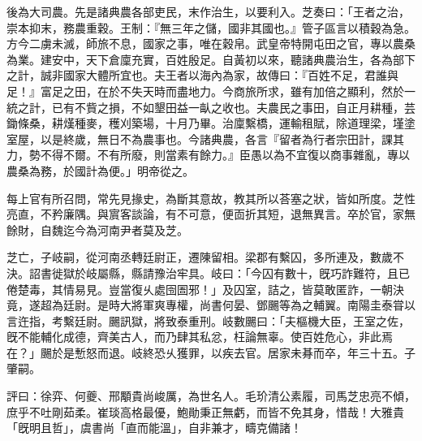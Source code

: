 \begin{pinyinscope}
 
 
 
 後為大司農。先是諸典農各部吏民，末作治生，以要利入。芝奏曰：「王者之治，崇本抑末，務農重穀。王制：『無三年之儲，國非其國也。』管子區言以積穀為急。方今二虜未滅，師旅不息，國家之事，唯在穀帛。武皇帝特開屯田之官，專以農桑為業。建安中，天下倉廩充實，百姓殷足。自黃初以來，聽諸典農治生，各為部下之計，誠非國家大體所宜也。夫王者以海內為家，故傳曰：『百姓不足，君誰與足！』富足之田，在於不失天時而盡地力。今商旅所求，雖有加倍之顯利，然於一統之計，已有不貲之損，不如墾田益一畒之收也。夫農民之事田，自正月耕種，芸鋤條桑，耕熯種麥，穫刈築場，十月乃畢。治廩繫橋，運輸租賦，除道理梁，墐塗室屋，以是終歲，無日不為農事也。今諸典農，各言『留者為行者宗田計，課其力，勢不得不爾。不有所廢，則當素有餘力。』臣愚以為不宜復以商事雜亂，專以農桑為務，於國計為便。」明帝從之。
 
 
 
 
 每上官有所召問，常先見掾史，為斷其意故，教其所以荅塞之狀，皆如所度。芝性亮直，不矜廉隅。與賔客談論，有不可意，便靣折其短，退無異言。卒於官，家無餘財，自魏迄今為河南尹者莫及芝。
 
 
芝亡，子岐嗣，從河南丞轉廷尉正，遷陳留相。梁郡有繫囚，多所連及，數歲不決。詔書徙獄於岐屬縣，縣請豫治牢具。岐曰：「今囚有數十，旣巧詐難符，且已倦楚毒，其情易見。豈當復乆處囹圄邪！」及囚室，詰之，皆莫敢匿詐，一朝決竟，遂超為廷尉。是時大將軍爽專權，尚書何晏、鄧颺等為之輔翼。南陽圭泰甞以言迕指，考繫廷尉。颺訊獄，將致泰重刑。岐數颺曰：「夫樞機大臣，王室之佐，旣不能輔化成德，齊美古人，而乃肆其私忿，枉論無辜。使百姓危心，非此焉在？」颺於是慙怒而退。岐終恐乆獲罪，以疾去官。居家未朞而卒，年三十五。子肇嗣。
 
 
 
 
 評曰：徐弈、何夔、邢顒貴尚峻厲，為世名人。毛玠清公素履，司馬芝忠亮不傾，庶乎不吐剛茹柔。崔琰高格最優，鮑勛秉正無虧，而皆不免其身，惜哉！大雅貴「旣明且哲」，虞書尚「直而能溫」，自非兼才，疇克備諸！
 
 
\end{pinyinscope}